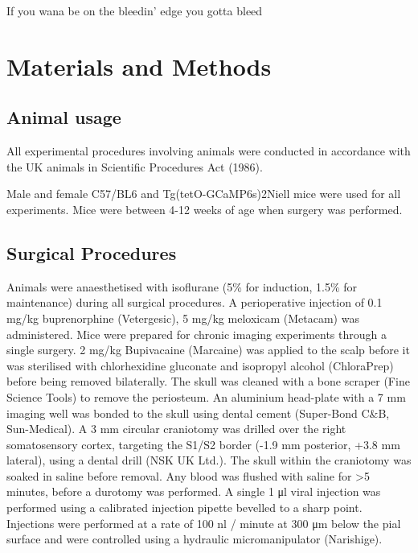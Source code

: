\begin{savequote}[8cm]

If you wana be on the bleedin' edge you gotta bleed 
\end{savequote}

\chapter{\label{ch:2-Materials and Methods}Materials and Methods} 

\minitoc

\section{Animal usage}

All experimental procedures involving animals were conducted in accordance with the UK animals in Scientific Procedures Act (1986).

Male and female C57/BL6 and Tg(tetO-GCaMP6s)2Niell mice were used for all experiments. Mice were between 4-12 weeks of age when surgery was performed.

\section{Surgical Procedures}
Animals were anaesthetised with isoflurane (5\% for induction, 1.5\% for maintenance) during all surgical procedures. A perioperative injection of 0.1 mg/kg buprenorphine (Vetergesic), 5 mg/kg meloxicam (Metacam) was administered. Mice were prepared for chronic imaging experiments through a single surgery. 2 mg/kg Bupivacaine (Marcaine) was applied to the scalp before it was sterilised with chlorhexidine gluconate and isopropyl alcohol (ChloraPrep) before being removed bilaterally. The skull was cleaned with a bone scraper (Fine Science Tools) to remove the periosteum. An aluminium head-plate with a 7 mm imaging well was bonded to the skull using dental cement (Super-Bond C\&B, Sun-Medical). A 3 mm circular craniotomy was drilled over the right somatosensory cortex, targeting the S1/S2 border (-1.9 mm posterior, +3.8 mm lateral), using a dental drill (NSK UK Ltd.). The skull within the craniotomy was soaked in saline before removal. Any blood was flushed with saline for >5 minutes, before a durotomy was performed. A single 1 μl viral injection was performed using a calibrated injection pipette bevelled to a sharp point. Injections were performed at a rate of 100 nl / minute at 300 μm below the pial surface and were controlled using a hydraulic micromanipulator (Narishige). 

